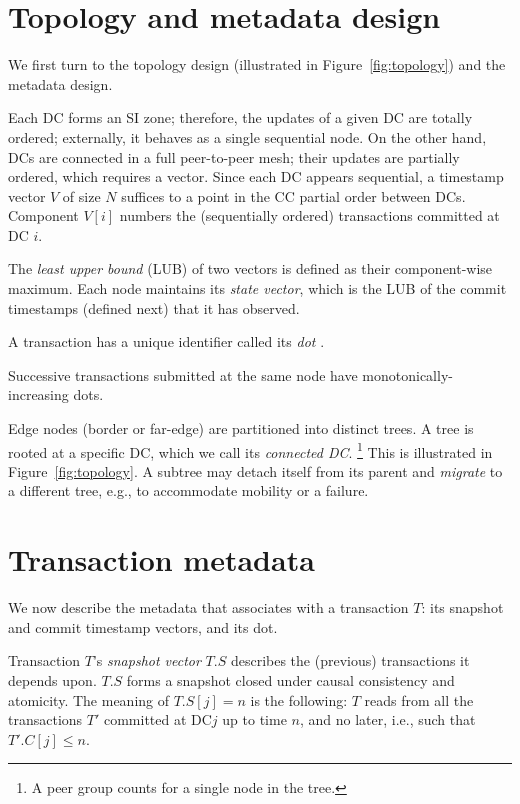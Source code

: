 \section{Topology and metadata design}
\label{sec:topology-metadata-design}

We first turn to the topology design (illustrated in
Figure~\ref{fig:topology}) and the metadata design.

Each DC forms an SI zone; therefore, the updates of a given DC are
totally ordered; externally, it behaves as a single sequential node.
On the other hand, DCs are connected in a full peer-to-peer mesh; their
updates are partially ordered, which requires a vector.
Since each DC appears sequential, a timestamp vector $V$ of size $N$
suffices to a point in the CC partial order between DCs.
Component $V[i]$ numbers the (sequentially ordered) transactions
committed at DC $i$.

The \emph{least upper bound} (LUB) of two vectors is defined as their
component-wise maximum.
Each node maintains its \emph{state vector}, which is the LUB of
the commit timestamps (defined next) that it has observed.

A transaction has a unique identifier called its \emph{dot}
\cite{rep:alg:1724}.

Successive transactions submitted at the same node have
monotonically-increasing dots.

Edge nodes (border or far-edge) are partitioned into distinct trees.
A tree is rooted at a specific DC, which we call its \emph{connected
  DC}\@.%
%
\footnote{
  A peer group counts for a single node in the tree.
}
%
This is illustrated in Figure~\ref{fig:topology}.
A subtree may detach itself from its parent and \emph{migrate} to a
different tree, e.g., to accommodate mobility or a failure.

\section{Transaction metadata}
\label{sec:transactions}

We now describe the metadata that \system{} associates with a
transaction $T$: its snapshot and commit timestamp vectors, and its dot.

Transaction $T$'s \emph{snapshot vector} $T.S$ describes the (previous)
transactions it depends upon.
$T.S$ forms a snapshot closed under causal consistency and atomicity.
The meaning of $T.S[j]=n$ is the following: $T$ reads from all the
transactions $T'$ committed at DC$j$ up to time $n$, and no later, i.e.,
such that $T'.C[j] \le n$.

